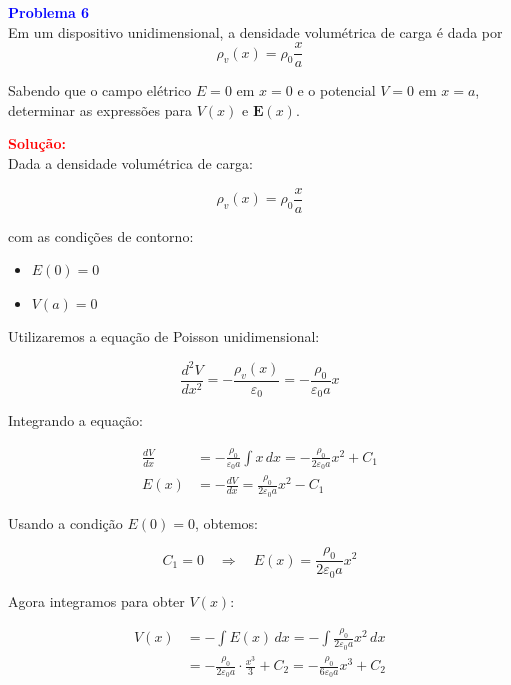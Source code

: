 \documentclass[a4paper,12pt]{article}
\begin{document}
\begin{flushleft}
\textbf{\textcolor{blue}{\Large Problema 6}}\\

Em um dispositivo unidimensional, a densidade volumétrica de carga é dada por
\begin{equation}
\rho_v(x) = \rho_0 \frac{x}{a}
\end{equation}

\noindent
Sabendo que o campo elétrico \( E = 0 \) em \( x = 0 \) e o potencial \( V = 0 \) em \( x = a \), 
determinar as expressões para \( V(x) \) e \( \mathbf{E}(x) \).

\textcolor{red}{\textbf{Solução:}}\\


Dada a densidade volumétrica de carga:

\begin{equation}
\rho_v(x) = \rho_0 \frac{x}{a}
\end{equation}

\noindent
com as condições de contorno:
\begin{itemize}
    \item \( E(0) = 0 \)
    \item \( V(a) = 0 \)
\end{itemize}

\noindent
Utilizaremos a equação de Poisson unidimensional:

\begin{equation}
\frac{d^2 V}{dx^2} = -\frac{\rho_v(x)}{\varepsilon_0} = -\frac{\rho_0}{\varepsilon_0 a} x
\end{equation}

Integrando a equação:

\begin{align}
\frac{dV}{dx} &= -\frac{\rho_0}{\varepsilon_0 a} \int x \, dx = -\frac{\rho_0}{2\varepsilon_0 a} x^2 + C_1 \\
E(x) &= -\frac{dV}{dx} = \frac{\rho_0}{2\varepsilon_0 a} x^2 - C_1
\end{align}

Usando a condição \( E(0) = 0 \), obtemos:

\begin{equation}
C_1 = 0 \quad \Rightarrow \quad E(x) = \frac{\rho_0}{2\varepsilon_0 a} x^2
\end{equation}

Agora integramos para obter \( V(x) \):

\begin{align}
V(x) &= -\int E(x)\, dx = -\int \frac{\rho_0}{2\varepsilon_0 a} x^2 \, dx \\
&= -\frac{\rho_0}{2\varepsilon_0 a} \cdot \frac{x^3}{3} + C_2 = -\frac{\rho_0}{6\varepsilon_0 a} x^3 + C_2
\end{align}


\end{flushleft}
\end{document}
